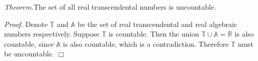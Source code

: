 \documentclass[12pt]{article}
\begin{document}
\emph{Theorem.}The set of all real transcendental numbers is uncountable.

\emph{Proof.}
Denote $\mathbb{T}$ and $\mathbb{A}$ be the set of real transcendental and real algebraic numbers respectively. Suppose $\mathbb{T}$ is countable. Then the union $\mathbb{T} \cup \mathbb{A} = \mathbb{R}$ is also countable, since $\mathbb{A}$ is also countable, which is a contradiction. Therefore $\mathbb{T}$ must be uncountable. $\Box$ 
\end{document}
